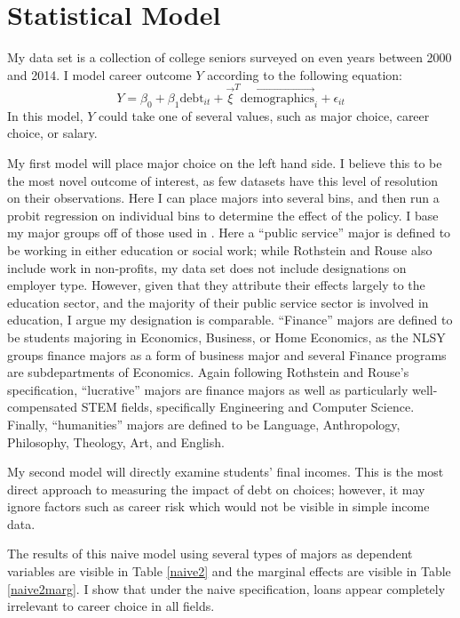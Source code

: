 \documentclass[12pt]{article}
\begin{document}
	\section{Statistical Model}
	
	My data set is a collection of college seniors surveyed on even years between 2000 and 2014. I model career outcome $Y$ according to the following equation: 
	\begin{equation}
	Y = \beta_0 + \beta_1 \mbox{debt}_{it} + \vec{\xi}^T \vec{\mbox{demographics}}_i + \epsilon_{it} \label{naiveeq}
	\end{equation} 
	In this model, $Y$ could take one of several values, such as major choice, career choice, or salary. 
	
	My first model will place major choice on the left hand side. I believe this to be the most novel outcome of interest, as few datasets have this level of resolution on their observations. Here I can place majors into several bins, and then run a probit regression on individual bins to determine the effect of the policy. I base my major groups off of those used in \textcite{rothstein2011}. Here a ``public service'' major is defined to be working in either education or social work; while Rothstein and Rouse also include work in non-profits, my data set does not include designations on employer type. However, given that they attribute their effects largely to the education sector, and the majority of their public service sector is involved in education, I argue my designation is comparable. ``Finance'' majors are defined to be students majoring in Economics, Business, or Home Economics, as the NLSY groups finance majors as a form of business major and several Finance programs are subdepartments of Economics. Again following Rothstein and Rouse's specification, ``lucrative'' majors are finance majors as well as particularly well-compensated STEM fields, specifically Engineering and Computer Science. Finally, ``humanities'' majors are defined to be Language, Anthropology, Philosophy, Theology, Art, and English.
	
	My second model will directly examine students' final incomes. This is the most direct approach to measuring the impact of debt on choices; however, it may ignore factors such as career risk which would not be visible in simple income data.
	
	The results of this naive model using several types of majors as dependent variables are visible in Table \ref{naive2} and the marginal effects are visible in Table \ref{naive2marg}. I show that under the naive specification, loans appear completely irrelevant to career choice in all fields.
	
\end{document}
